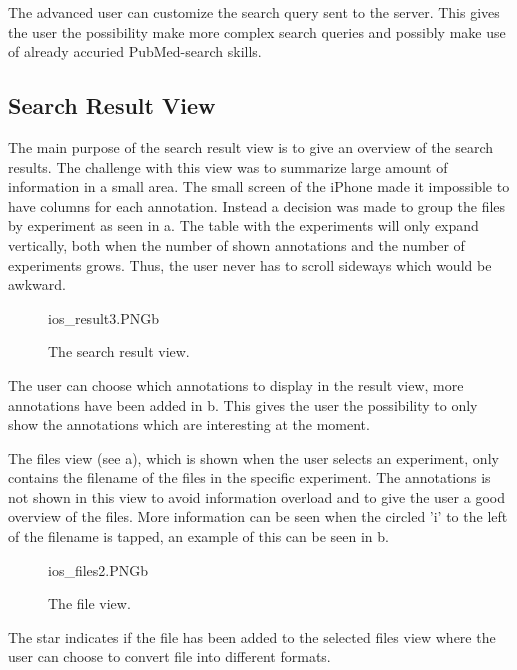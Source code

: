 The advanced user can customize the search query sent to the server. This gives the user the possibility make more complex search queries and possibly make use of already accuried PubMed-search skills.

\subsection{Search Result View}
The main purpose of the search result view is to give an overview of the search results. The challenge with this view was to summarize large amount of information in a small area. The small screen of the iPhone made it impossible to have columns for each annotation. Instead a decision was made to group the files by experiment as seen in a. The table with the experiments will only expand vertically, both when the number of shown annotations and the number of experiments grows. Thus, the user never has to scroll sideways which would be awkward.

\begin{figure}[ht]
		{ios_result3.PNG}{b}
\caption{The search result view.}
\label{fig:ios_searchResult2}
\end{figure}
\FloatBarrier

The user can choose which annotations to display in the result view, more annotations have been added in b. This gives the user the possibility to only show the annotations which are interesting at the moment. 

The files view (see a), which is shown when the user selects an experiment, only contains the filename of the files in the specific experiment. The annotations is not shown in this view to avoid information overload and to give the user a good overview of the files. More information can be seen when the circled 'i' to the left of the filename is tapped, an example of this can be seen in b. 

\begin{figure}[ht]
		{ios_files2.PNG}{b}
\caption{The file view.}
\label{fig:ios_files2}
\end{figure}
\FloatBarrier

The star indicates if the file has been added to the selected files view where the user can choose to convert file into different formats.

